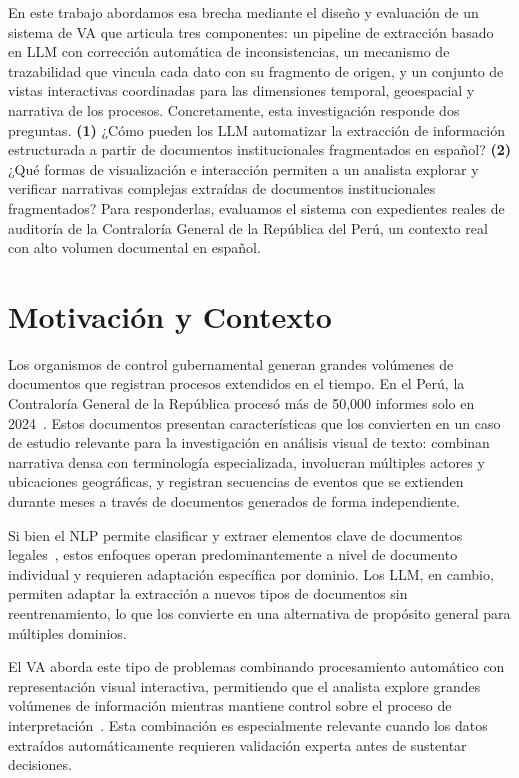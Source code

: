 En este trabajo abordamos esa brecha mediante el diseño y 
evaluación de un sistema de \ac{VA} que articula tres componentes: un 
pipeline de extracción basado en \acs{LLM} con corrección automática de 
inconsistencias, un mecanismo de trazabilidad que vincula cada 
dato con su fragmento de origen, y un conjunto de vistas 
interactivas coordinadas para las dimensiones temporal, geoespacial 
y narrativa de los procesos. Concretamente, esta investigación 
responde dos preguntas. \textbf{(1)} ¿Cómo pueden los \acs{LLM} automatizar la extracción de información estructurada a partir de documentos institucionales fragmentados en español? \textbf{(2)} 
¿Qué formas de visualización e interacción permiten a un 
analista explorar y verificar narrativas complejas extraídas 
de documentos institucionales fragmentados? Para 
responderlas, evaluamos el sistema con expedientes reales de 
auditoría de la Contraloría General de la República del Perú, un contexto real con alto volumen documental en español.




\section{Motivación y Contexto}

Los organismos de control gubernamental generan grandes 
volúmenes de documentos que registran procesos extendidos en 
el tiempo. En el Perú, la Contraloría General de la República 
procesó más de 50,000 informes solo en 
2024~\cite{andina2024}. Estos documentos presentan 
características que los convierten en un caso de estudio 
relevante para la investigación en análisis visual de texto: 
combinan narrativa densa con terminología especializada, 
involucran múltiples actores y ubicaciones geográficas, y 
registran secuencias de eventos que se extienden durante 
meses a través de documentos generados de forma 
independiente.

Si bien el \ac{NLP} permite clasificar y extraer elementos 
clave de documentos legales~\cite{zhong-etal-2020-nlp, 
lippi2019legal}, estos enfoques operan predominantemente a 
nivel de documento individual y requieren adaptación 
específica por dominio. Los \acs{LLM}, en cambio, permiten 
adaptar la extracción a nuevos tipos de documentos sin 
reentrenamiento, lo que los convierte en una alternativa 
de propósito general para múltiples dominios.

El \ac{VA} aborda este tipo de problemas combinando procesamiento automático con representación visual interactiva, permitiendo que el analista explore grandes volúmenes de información mientras mantiene control sobre el proceso de interpretación~\cite{keim2008visual, sacha2014}. Esta combinación es especialmente relevante cuando los datos extraídos automáticamente requieren validación experta antes de sustentar decisiones.

